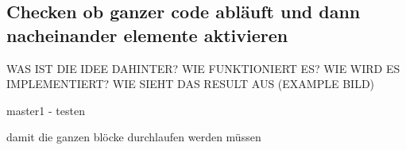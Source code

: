 \subsection{Checken ob ganzer code abläuft und dann nacheinander elemente aktivieren} \label{subsection:counter-modifications-flow}

WAS IST DIE IDEE DAHINTER? WIE FUNKTIONIERT ES? WIE WIRD ES IMPLEMENTIERT? WIE SIEHT DAS RESULT AUS (EXAMPLE BILD)\newline

master1 - testen\newline

damit die ganzen blöcke durchlaufen werden müssen
